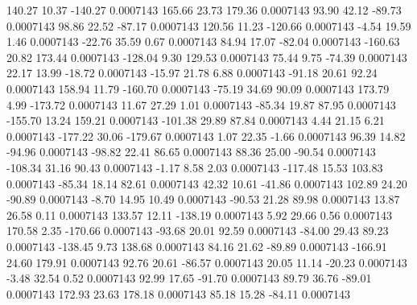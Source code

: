       140.27       10.37     -140.27     0.0007143
      165.66       23.73      179.36     0.0007143
       93.90       42.12      -89.73     0.0007143
       98.86       22.52      -87.17     0.0007143
      120.56       11.23     -120.66     0.0007143
       -4.54       19.59        1.46     0.0007143
      -22.76       35.59        0.67     0.0007143
       84.94       17.07      -82.04     0.0007143
     -160.63       20.82      173.44     0.0007143
     -128.04        9.30      129.53     0.0007143
       75.44        9.75      -74.39     0.0007143
       22.17       13.99      -18.72     0.0007143
      -15.97       21.78        6.88     0.0007143
      -91.18       20.61       92.24     0.0007143
      158.94       11.79     -160.70     0.0007143
      -75.19       34.69       90.09     0.0007143
      173.79        4.99     -173.72     0.0007143
       11.67       27.29        1.01     0.0007143
      -85.34       19.87       87.95     0.0007143
     -155.70       13.24      159.21     0.0007143
     -101.38       29.89       87.84     0.0007143
        4.44       21.15        6.21     0.0007143
     -177.22       30.06     -179.67     0.0007143
        1.07       22.35       -1.66     0.0007143
       96.39       14.82      -94.96     0.0007143
      -98.82       22.41       86.65     0.0007143
       88.36       25.00      -90.54     0.0007143
     -108.34       31.16       90.43     0.0007143
       -1.17        8.58        2.03     0.0007143
     -117.48       15.53      103.83     0.0007143
      -85.34       18.14       82.61     0.0007143
       42.32       10.61      -41.86     0.0007143
      102.89       24.20      -90.89     0.0007143
       -8.70       14.95       10.49     0.0007143
      -90.53       21.28       89.98     0.0007143
       13.87       26.58        0.11     0.0007143
      133.57       12.11     -138.19     0.0007143
        5.92       29.66        0.56     0.0007143
      170.58        2.35     -170.66     0.0007143
      -93.68       20.01       92.59     0.0007143
      -84.00       29.43       89.23     0.0007143
     -138.45        9.73      138.68     0.0007143
       84.16       21.62      -89.89     0.0007143
     -166.91       24.60      179.91     0.0007143
       92.76       20.61      -86.57     0.0007143
       20.05       11.14      -20.23     0.0007143
       -3.48       32.54        0.52     0.0007143
       92.99       17.65      -91.70     0.0007143
       89.79       36.76      -89.01     0.0007143
      172.93       23.63      178.18     0.0007143
       85.18       15.28      -84.11     0.0007143
